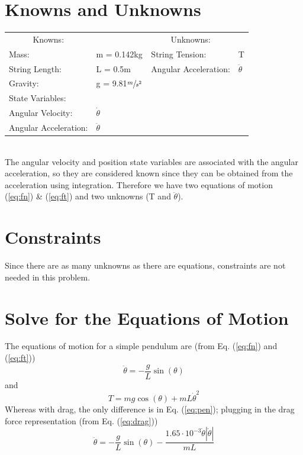 \documentclass[12pt]{report}
\begin{document}
\begin{flushleft}
\section{Knowns and Unknowns} \label{knownsandunknowns}
\begin{tabular}{ll@{\hskip .75in}ll}
  \multicolumn{1}{c}{Knowns:} && \multicolumn{1}{c}{Unknowns:} \\
  Mass: &m = 0.142kg & String Tension: & T \\
  String Length: &L = 0.5m & Angular Acceleration: & $\ddot{\theta}$ \\
  Gravity: &g = 9.81$\sfrac{m}{s^2}$ \\
  State Variables: \\
  \quad Angular Velocity: &$\dot{\theta}$ & \\
  \quad Angular Acceleration:&$\ddot{\theta}$ & \\
\end{tabular}
\vspace{2ex}
\\
The angular velocity and position state variables are associated with the angular
acceleration, so they are considered known since they can be obtained from the
acceleration using integration. Therefore we have two equations of motion
(\ref{eq:fn}) \& (\ref{eq:ft}) and two unknowns (T and $\ddot{\theta}$).
\section{Constraints}
Since there are as many unknowns as there are equations, constraints are not needed
in this problem. \\
\section{Solve for the Equations of Motion}
The equations of motion for a simple pendulum are
 (from Eq. (\ref{eq:fn}) and (\ref{eq:ft}))
\begin{equation} \label{eq:pen}
\ddot{\theta} = -\frac{g}{L}\sin(\theta)
\end{equation}
\center and
\begin{equation} \label{eq:T}
T = mg\cos(\theta) + mL\dot{\theta}^2
\end{equation}
Whereas with drag, the only difference is in Eq. (\ref{eq:pen}); plugging in
the drag force representation (from Eq. (\ref{eq:drag}))
\begin{equation}\label{eq:drageom}
  \ddot{\theta} = -\frac{g}{L}\sin(\theta) - \frac{1.65 \cdot 10^{-3}\dot{\theta}|\dot{\theta}|}{mL}
\end{equation}

\end{flushleft}
\end{document}

